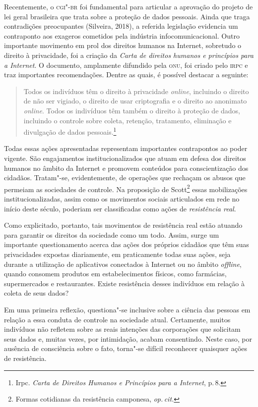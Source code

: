 Recentemente, o \textsc{cgi"-br} foi fundamental para articular a aprovação do
projeto de lei geral brasileira que trata sobre a proteção de dados
pessoais. Ainda que traga contradições preocupantes (Silveira, 2018), a
referida legislação evidencia um contraponto aos exageros cometidos pela
indústria infocomunicacional. Outro importante movimento em prol dos
direitos humanos na Internet, sobretudo o direito à privacidade, foi a
criação da \textit{Carta de direitos humanos e princípios para a Internet}. O
documento, amplamente difundido pela \textsc{onu}, foi criado pelo \textsc{irpc} e traz
importantes recomendações. Dentre as quais, é possível destacar a
seguinte:

\begin{quote}
Todos os indivíduos têm o direito à privacidade \textit{online}, incluindo o
direito de não ser vigiado, o direito de usar criptografia e o direito
ao anonimato \textit{online}. Todos os indivíduos têm também o direito à proteção
de dados, incluindo o controle sobre coleta, retenção, tratamento,
eliminação e divulgação de dados pessoais.\footnote{Irpc. \textit{Carta de Direitos Humanos e Princípios para a Internet}, p.\,8.}
\end{quote}

Todas essas ações apresentadas representam importantes contrapontos ao
poder vigente. São engajamentos institucionalizados que atuam em defesa
dos direitos humanos no âmbito da Internet e promovem conteúdos para
conscientização dos cidadãos. Tratam"-se, evidentemente, de operações que
rechaçam os abusos que permeiam as sociedades de controle. Na proposição
de Scott\footnote{Formas cotidianas da resistência camponesa, \textit{op.\,cit.}} essas mobilizações
institucionalizadas, assim como os movimentos sociais articulados em
rede no início deste século, poderiam ser classificadas como ações de
\textit{resistência real}.

Como explicitado, portanto, tais movimentos de resistência real estão
atuando para garantir os direitos da sociedade como um todo. Assim,
surge um importante questionamento acerca das ações dos próprios
cidadãos que têm suas privacidades expostas diariamente, em praticamente
todas suas ações, seja durante a utilização de aplicativos conectados à
Internet ou no âmbito \textit{offline}, quando consomem produtos em
estabelecimentos físicos, como farmácias, supermercados e restaurantes.
Existe resistência desses indivíduos em relação à coleta de seus dados?

Em uma primeira reflexão, questiona"-se inclusive sobre a ciência das
pessoas em relação a essa conduta de controle na sociedade atual.
Certamente, muitos indivíduos não refletem sobre as reais intenções das
corporações que solicitam seus dados e, muitas vezes, por intimidação,
acabam consentindo. Neste caso, por ausência de consciência sobre o
fato, torna"-se difícil reconhecer quaisquer ações de resistência.

